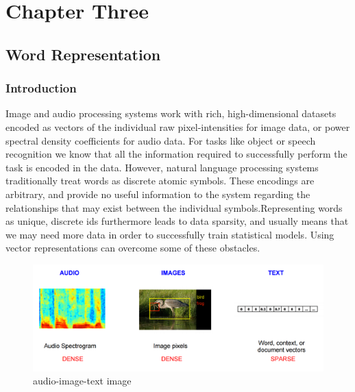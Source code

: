 \chapter{Chapter Three}%
\label{chap:Chapter_Three}

\section{Word Representation}
\label{chap:Word Representation}

  \subsection{Introduction}

Image and audio processing systems work with rich, high-dimensional datasets encoded as vectors of the individual raw pixel-intensities for image data, or power spectral density coefficients for audio data. For tasks like object or speech recognition we know that all the information required to successfully perform the task is encoded in the data. However, natural language processing systems traditionally treat words as discrete atomic symbols. These encodings are arbitrary, and provide no useful information to the system regarding the relationships that may exist between the individual symbols.Representing words as unique, discrete ids furthermore leads to data sparsity, and usually means that we may need more data in order to successfully train statistical models. Using vector representations can overcome some of these obstacles\cite{web003}\@.
  
 \begin{figure}[H]%
    \center%
    \includegraphics[width=1\textwidth]{images/audio-image-text.png}%
    \caption[This is audio-image-text image]{audio-image-text image}\label{fig:audio-image-text}%
 \end{figure}
 
